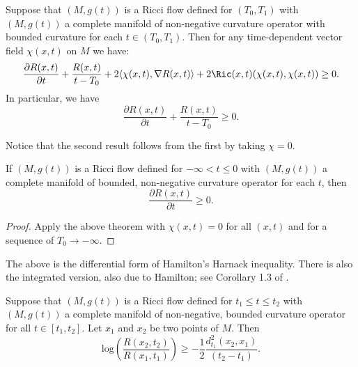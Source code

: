 \begin{theorem}
\label{thm:hamilton-harnack-inequality}
\label{Harnack}
Suppose that $(M,g(t))$ is a Ricci flow defined for $(T_0,T_1)$ with
$(M,g(t))$ a complete manifold of non-negative curvature operator
with bounded curvature  for each $t\in (T_0,T_1)$. Then for any
time-dependent vector field $\chi(x,t)$ on $M$ we have:
$$\frac{\partial R(x,t)}{\partial t}+\frac{R(x,t)}{t-T_0}+2\langle
\chi(x,t),\nabla R(x,t)\rangle +2\Ric(x,t)(\chi(x,t),\chi(x,t))\ge 0.$$ In particular, we have
$$\frac{\partial R(x,t)}{\partial t}+\frac{R(x,t)}{t-T_0}\ge 0.$$
\end{theorem}



\begin{remark}
\label{rem:harnack-inequality-zero-field-case}
Notice that the second result follows from the first by taking
$\chi=0$.
\end{remark}

\begin{corollary}
\label{cor:ancient-flow-scalar-curvature-nondecreasing}
\label{posderiv}
If $(M,g(t))$ is a Ricci flow defined for $-\infty<t\le 0$ with
$(M,g(t))$ a complete manifold of bounded, non-negative curvature
operator for each $t$, then
$$\frac{\partial R(x,t)}{\partial t}\ge 0.$$
\end{corollary}

\begin{proof}
Apply the above theorem with $\chi(x,t)=0$ for all $(x,t)$ and for a
sequence of $T_0\rightarrow -\infty$.
\end{proof}


The above is the differential form of Hamilton's Harnack inequality.
There is also the integrated version, also due to Hamilton; see
Corollary 1.3 of \cite{Hamiltonharnack}.

\begin{theorem}
\label{thm:harnack-inequality-integrated}
\label{Harnack2}
Suppose that $(M,g(t))$ is a Ricci flow defined for $t_1\le t\le
t_2$ with $(M,g(t))$ a complete manifold of non-negative, bounded
curvature operator for all $t\in [t_1,t_2]$. Let $x_1$ and $x_2$ be
two points of $M$.  Then $$\mathrm{log}\left(\frac{R(x_2,t_2)}{R(x_1,t_1)}\right)\ge
-\frac{1}{2}\frac{d^2_{t_1}(x_2,x_1)}{(t_2-t_1)}.$$
\end{theorem}


